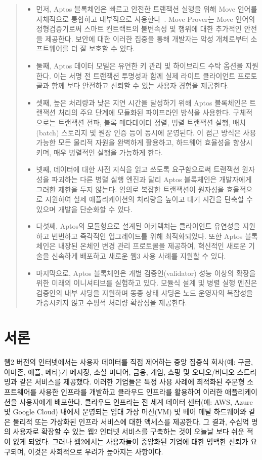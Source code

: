 \documentclass{article}
\begin{document}
\begin{abstract}
 \begin{itemize}
  \item 먼저, Aptos 블록체인은 빠르고 안전한 트랜잭션 실행을 위해 Move 언어를 자체적으로 통합하고 내부적으로 사용한다~\cite{move_github}. Move Prover는 Move 언어의 정형검증기로써 스마트 컨트랙트의 불변속성 및 행위에 대한 추가적인 안전을 제공한다. 보안에 대한 이러한 집중을 통해 개발자는 악성 개체로부터 소프트웨어를 더 잘 보호할 수 있다.
  \item 둘째, Aptos 데이터 모델은 유연한 키 관리 및 하이브리드 수탁 옵션을 지원한다. 이는 서명 전 트랜잭션 투명성과 함께 실제 라이트 클라이언트 프로토콜과 함께 보다 안전하고 신뢰할 수 있는 사용자 경험을 제공한다. 
  \item 셋째, 높은 처리량과 낮은 지연 시간을 달성하기 위해 Aptos 블록체인은 트랜잭션 처리의 주요 단계에 모듈화된 파이프라인 방식을 사용한다. 구체적으로는 트랜잭션 전파, 블록 메타데이터 정렬, 병렬 트랜잭션 실행, 배치(batch) 스토리지 및 원장 인증 등이 동시에 운영된다. 이 접근 방식은 사용 가능한 모든 물리적 자원을 완벽하게 활용하고, 하드웨어 효율성을 향상시키며, 매우 병렬적인 실행을 가능하게 한다.
  \item 넷째, 데이터에 대한 사전 지식을 읽고 쓰도록 요구함으로써 트랜잭션 원자성을 파괴하는 다른 병렬 실행 엔진과 달리 Aptos 블록체인은 개발자에게 그러한 제한을 두지 않는다. 임의로 복잡한 트랜잭션이 원자성을 효율적으로 지원하여 실제 애플리케이션의 처리량을 높이고 대기 시간을 단축할 수 있으며 개발을 단순화할 수 있다.
  \item 다섯째, Aptos의 모듈형으로 설계된 아키텍처는 클라이언트 유연성을 지원하고 빈번하고 즉각적인 업그레이드를 위해 최적화되었다. 또한 Aptos 블록체인은 내장된 온체인 변경 관리 프로토콜을 제공하여, 혁신적인 새로운 기술을 신속하게 배포하고 새로운 웹3 사용 사례를 지원할 수 있다.
  \item 마지막으로, Aptos 블록체인은 개별 검증인(validator) 성능 이상의 확장을 위한 미래의 이니셔티브를 실험하고 있다. 모듈식 설계 및 병렬 실행 엔진은 검증인의 내부 샤딩을 지원하며 동종 상태 샤딩은 노드 운영자의 복잡성을 가중시키지 않고 수평적 처리량 확장성을 제공한다.
\end{itemize}

\end{abstract}

\section{서론}
\label{sec:introduction}

웹2 버전의 인터넷에서는 사용자 데이터를 직접 제어하는 중앙 집중식 회사(예: 구글, 아마존, 애플, 메타)가 메시징, 소셜 미디어, 금융, 게임, 쇼핑 및 오디오/비디오 스트리밍과 같은 서비스를 제공했다. 이러한 기업들은 특정 사용 사례에 최적화된 주문형 소프트웨어를 사용한 인프라를 개발하고 클라우드 인프라를 활용하여 이러한 애플리케이션을 사용자에게 배포한다. 클라우드 인프라는 전 세계 데이터 센터(예: AWS, Azure 및 Google Cloud) 내에서 운영되는 임대 가상 머신(VM) 및 베어 메탈 하드웨어와 같은 물리적 또는 가상화된 인프라 서비스에 대한 액세스를 제공한다. 그 결과, 수십억 명의 사용자로 확장할 수 있는 웹2 인터넷 서비스를 구축하는 것이 오늘날 보다 쉬운 적이 없게 되었다. 그러나 웹2에서는 사용자들이 중앙화된 기업에 대한 명백한 신뢰가 요구되며, 이것은 사회적으로 우려가 높아지는 사항이다.
\end{document}
